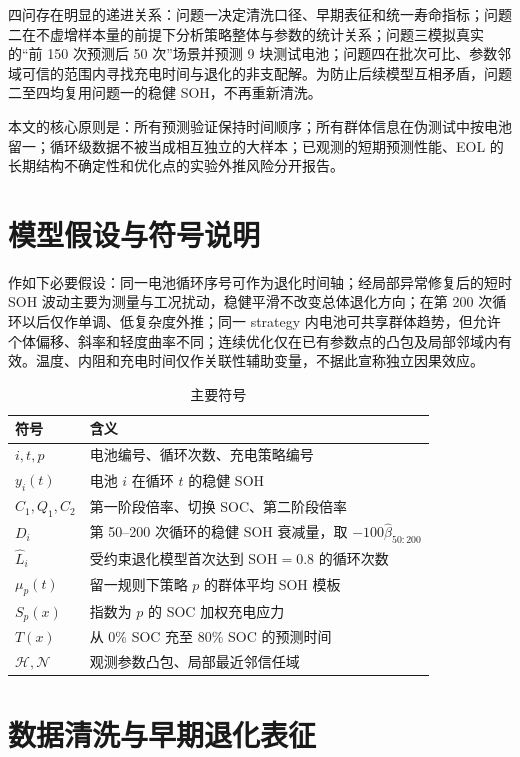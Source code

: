 \documentclass[UTF8,a4paper,zihao=-4]{ctexart}
\newcommand{\SOH}{\mathrm{SOH}}
\begin{document}
四问存在明显的递进关系：问题一决定清洗口径、早期表征和统一寿命指标；问题二在不虚增样本量的前提下分析策略整体与参数的统计关系；问题三模拟真实的“前 150 次预测后 50 次”场景并预测 9 块测试电池；问题四在批次可比、参数邻域可信的范围内寻找充电时间与退化的非支配解。为防止后续模型互相矛盾，问题二至四均复用问题一的稳健 SOH，不再重新清洗。

本文的核心原则是：所有预测验证保持时间顺序；所有群体信息在伪测试中按电池留一；循环级数据不被当成相互独立的大样本；已观测的短期预测性能、EOL 的长期结构不确定性和优化点的实验外推风险分开报告。

\section{模型假设与符号说明}\label{sec:assumption}

作如下必要假设：同一电池循环序号可作为退化时间轴；经局部异常修复后的短时 SOH 波动主要为测量与工况扰动，稳健平滑不改变总体退化方向；在第 200 次循环以后仅作单调、低复杂度外推；同一 strategy 内电池可共享群体趋势，但允许个体偏移、斜率和轻度曲率不同；连续优化仅在已有参数点的凸包及局部邻域内有效。温度、内阻和充电时间仅作关联性辅助变量，不据此宣称独立因果效应。

\begin{table}[H]
\centering
\caption{主要符号}
\begin{tabularx}{0.94\textwidth}{>{\centering\arraybackslash}p{2.2cm}X}
\toprule
符号 & 含义 \\
\midrule
$i,t,p$ & 电池编号、循环次数、充电策略编号 \\
$y_i(t)$ & 电池 $i$ 在循环 $t$ 的稳健 SOH \\
$C_1,Q_1,C_2$ & 第一阶段倍率、切换 SOC、第二阶段倍率 \\
$D_i$ & 第 50--200 次循环的稳健 SOH 衰减量，取 $-100\hat\beta_{50:200}$ \\
$\widehat L_i$ & 受约束退化模型首次达到 $\SOH=0.8$ 的循环次数 \\
$\mu_p(t)$ & 留一规则下策略 $p$ 的群体平均 SOH 模板 \\
$S_p(x)$ & 指数为 $p$ 的 SOC 加权充电应力 \\
$T(x)$ & 从 0\% SOC 充至 80\% SOC 的预测时间 \\
$\mathcal H,\mathcal N$ & 观测参数凸包、局部最近邻信任域 \\
\bottomrule
\end{tabularx}
\end{table}

\section{数据清洗与早期退化表征}\label{sec:data}
\end{document}
